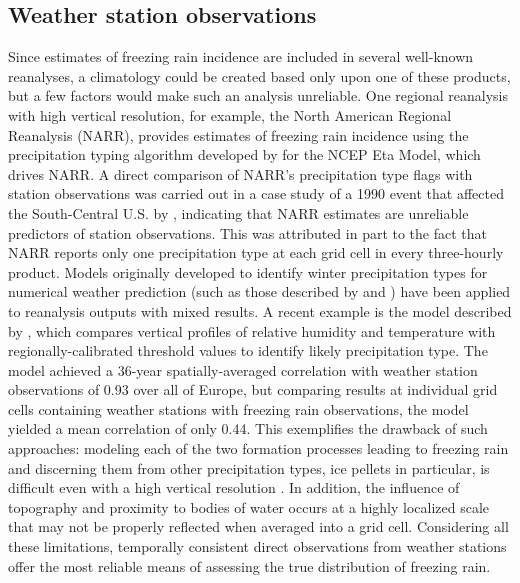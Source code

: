 \documentclass[twocol]{ametsoc}
\begin{document}
\subsection{Weather station observations}
Since estimates of freezing rain incidence are included in several well-known reanalyses, a climatology could be created based only upon one of these products, but a few factors would make such an analysis unreliable. One regional reanalysis with high vertical resolution, for example, the North American Regional Reanalysis (NARR), provides estimates of freezing rain incidence using the precipitation typing algorithm developed by \citet{baldwin1993development} for the NCEP Eta Model, which drives NARR. A direct comparison of NARR's precipitation type flags with station observations was carried out in a case study of a 1990 event that affected the South-Central U.S. by \citet{blunden2011138}, indicating that NARR estimates are unreliable predictors of station observations. This was attributed in part to the fact that NARR reports only one precipitation type at each grid cell in every three-hourly product. Models originally developed to identify winter precipitation types for numerical weather prediction (such as those described by \citet{cortinas2002probabilistic} and \citet{mullens2017multialgorithm}) have been applied to reanalysis outputs with mixed results. A recent example is the model described by \citet{kamarainen2017method}, which compares vertical profiles of relative humidity and temperature with regionally-calibrated threshold values to identify likely precipitation type. The model achieved a 36-year spatially-averaged correlation with weather station observations of 0.93 over all of Europe, but comparing results at individual grid cells containing weather stations with freezing rain observations, the model yielded a mean correlation of only 0.44. This exemplifies the drawback of such approaches: modeling each of the two formation processes leading to freezing rain and discerning them from other precipitation types, ice pellets in particular, is difficult even with a high vertical resolution \citep{reeves2014sources}. In addition, the influence of topography and proximity to bodies of water occurs at a highly localized scale that may not be properly reflected when averaged into a grid cell. Considering all these limitations, temporally consistent direct observations from weather stations offer the most reliable means of assessing the true distribution of freezing rain.
\end{document}
